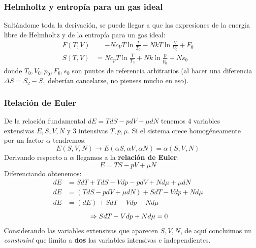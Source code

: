 \documentclass[]{article}
\numberwithin{equation}{section}
\newcommand{\0}{\textcolor{gray}{0}}
\begin{document}
\subsubsection{Helmholtz y entropía para un gas ideal}
Saltándome toda la derivación, se puede llegar a que las expresiones de la energía libre de Helmholtz y de la entropía para un gas ideal:
\begin{align}
	F(T,V) &= -Nc_VT\ln\frac{T}{T_0} - NkT\ln\frac{V}{V_0} + F_0\\
	S(T,V) &= Nc_pT\ln\frac{T}{T_0} + Nk\ln\frac{p}{p_0} + Ns_0
\end{align}
donde \(T_0, V_0, p_0, F_0, s_0\) son puntos de referencia arbitrarios (al hacer una diferencia \(\Delta S = S_2 - S_1\) deberían cancelarse, no pienses mucho en eso).

\subsubsection{Relación de Euler}
De la relación fundamental \(dE = TdS - pdV + \mu dN\) tenemos 4 variables extensivas \(E, S, V, N\) y 3 intensivas \(T, p, \mu\). Si el sistema crece homogéneamente por un factor \(\alpha\) tendremos:
\begin{equation*}
	E(S,V,N)\rightarrow E(\alpha S,\alpha V,\alpha N) = \alpha (S,V,N)
\end{equation*}
Derivando respecto a \(\alpha\) llegamos a la \textbf{relación de Euler}:
\begin{equation}
	E = TS - pV + \mu N
\end{equation}
Diferenciando obtenemos:
\begin{align*}
	dE &= SdT + TdS - Vdp - pdV + Nd\mu + \mu dN \nonumber\\
	dE &= (TdS - pdV + \mu dN) + SdT - Vdp + Nd\mu \nonumber\\
	dE &= (dE) + SdT - Vdp + Nd\mu \nonumber
\end{align*}
\begin{equation}\\
	\Rightarrow SdT - Vdp + Nd\mu = 0
\end{equation}
Considerando las variables extensivas que aparecen \(S,V,N\), de aquí concluimos un \textit{constraint} que limita a \textbf{dos} las variables intensivas e independientes.
\end{document}
